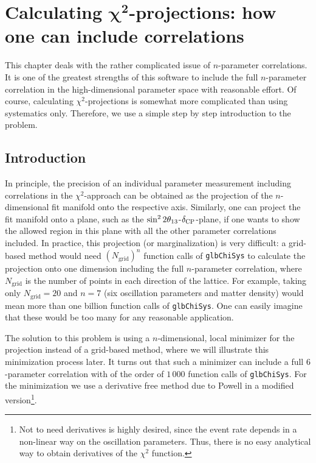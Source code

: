 \chapter[Calculating $\chi^2$-projections: how one can include correlations]{Calculating $\boldsymbol{\chi^2}$-projections: how one can include correlations}
\label{chapt:correlations}

This chapter deals with the rather complicated issue of $n$-parameter correlations. It is one of the greatest strengths of this software 
to include the full $n$-parameter correlation in the high-dimensional parameter space with reasonable effort. Of course, calculating $\chi^2$-projections is somewhat more complicated than using systematics only. Therefore, we use a simple step by step introduction to the problem. 

\section{Introduction}

In principle, the precision of an individual parameter measurement including
 correlations in the $\chi^2$-approach can be obtained as the projection of 
the $n$-dimensional fit manifold onto the respective axis. Similarly, one can 
project the fit manifold onto a plane, such as the $\sin^2 2 \theta_{13}$-$\delta_{\mathrm{CP}}$-plane,
 if one wants to show the allowed
region in this plane with all the other parameter correlations included. 
In practice, this projection (or marginalization) is very difficult: a grid-based method would 
need $(N_{\mathrm{grid}})^n$ function calls of {\tt glbChiSys} to 
calculate the projection onto one dimension 
including the full $n$-parameter correlation, where 
$N_{\mathrm{grid}}$ is the number of points in each direction of the 
lattice. For example, taking only $N_{\mathrm{grid}}=20$ and 
$n=7$ (six oscillation parameters and matter density) would mean more 
than one billion function calls of {\tt glbChiSys}. One can easily imagine 
that these would be too many for any reasonable application.

The solution to this problem is using a $n$-dimensional, local 
minimizer for the projection instead of a grid-based method, where we will
illustrate this minimization process later. It turns out
that such a minimizer can include a full $6$-parameter correlation 
with of the order of $1\, 000$ function calls of {\tt glbChiSys}. For the 
minimization we use a derivative free method due to Powell in a 
modified~\cite{Brent:1973} version\footnote{Not to need derivatives is
highly desired, since the event rate depends in a non-linear way on the
oscillation parameters. Thus, there is no easy analytical way
to obtain derivatives of the $\chi^2$ function.}.

